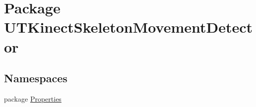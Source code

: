 \hypertarget{namespaceUTKinectSkeletonMovementDetector}{\section{Package U\-T\-Kinect\-Skeleton\-Movement\-Detector}
\label{namespaceUTKinectSkeletonMovementDetector}
}
\subsection*{Namespaces}
\begin{DoxyCompactItemize}
\item 
package \hyperlink{namespaceUTKinectSkeletonMovementDetector_1_1Properties}{Properties}
\end{DoxyCompactItemize}
